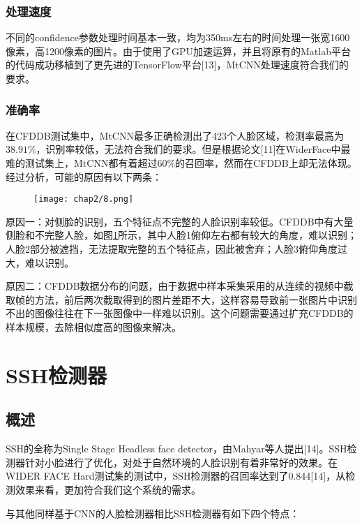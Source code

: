 \subsubsection{处理速度}

不同的confidence参数处理时间基本一致，均为350ms左右的时间处理一张宽1600像素，高1200像素的图片。由于使用了GPU加速运算，并且将原有的Matlab平台的代码成功移植到了更先进的TensorFlow平台[13]，MtCNN处理速度符合我们的要求。

\subsubsection{准确率}

在CFDDB测试集中，MtCNN最多正确检测出了423个人脸区域，检测率最高为$38.91\%$，识别率较低，无法符合我们的要求。但是根据论文[11]在WiderFace中最难的测试集上，MtCNN都有着超过$60\%$的召回率，然而在CFDDB上却无法体现。经过分析，可能的原因有以下两条：

\begin{figure}[!htp]
	\centering
	\texttt{[image: chap2/8.png]}
	\label{fig:mtcnn:accr}
\end{figure}


原因一：对侧脸的识别，五个特征点不完整的人脸识别率较低。CFDDB中有大量侧脸和不完整人脸，如图\ref{fig:mtcnn:accr}所示，其中人脸1俯仰左右都有较大的角度，难以识别；人脸2部分被遮挡，无法提取完整的五个特征点，因此被舍弃；人脸3俯仰角度过大，难以识别。


原因二：CFDDB数据分布的问题，由于数据中样本采集采用的从连续的视频中截取帧的方法，前后两次截取得到的图片差距不大，这样容易导致前一张图片中识别不出的图像往往在下一张图像中一样难以识别。这个问题需要通过扩充CFDDB的样本规模，去除相似度高的图像来解决。

\section{SSH检测器}

\subsection{概述}
SSH的全称为Single Stage Headless face detector，由Mahyar等人提出[14]。SSH检测器针对小脸进行了优化，对处于自然环境的人脸识别有着非常好的效果。在WIDER FACE Hard测试集的测试中，SSH检测器的召回率达到了0.844[14]，从检测效果来看，更加符合我们这个系统的需求。

与其他同样基于CNN的人脸检测器相比SSH检测器有如下四个特点：

